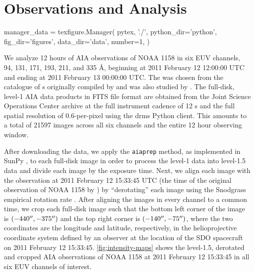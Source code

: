 \section{Observations and Analysis}\label{sec:observations}

\begin{pycode}
manager_data = texfigure.Manager(
    pytex, './',
    python_dir='python',
    fig_dir='figures',
    data_dir='data',
    number=1,
)
\end{pycode}

We analyze 12 hours of AIA observations of \AR{} NOAA 1158 in six EUV channels, 94, 131, 171, 193, 211, and 335 \AA{}, beginning at 2011 February 12 12:00:00 UTC and ending at 2011 February 13 00:00:00 UTC. The \AR{} was chosen from the catalogue of \AR s originally compiled by \citet{warren_systematic_2012} and was also studied by \citet{viall_survey_2017}. The full-disk, level-1 AIA data products in FITS file format are obtained from the Joint Science Operations Center \citep[JSOC,][]{couvidat_observables_2016} archive at the full instrument cadence of 12 s and the full spatial resolution of 0.6\arcsec-per-pixel using the drms Python client. This amounts to a total of 21597 images across all six channels and the entire 12 hour observing window.

After downloading the data, we apply the \texttt{aiaprep} method, as implemented in SunPy \citep{sunpy_community_sunpypython_2015}, to each full-disk image in order to process the level-1 data into level-1.5 data and divide each image by the exposure time. Next, we align each image with the observation at 2011 February 12 15:33:45 UTC (the time of the original observation of NOAA 1158 by \citet{warren_systematic_2012}) by ``derotating'' each image using the Snodgrass empirical rotation rate \citep{snodgrass_magnetic_1983}. After aligning the images in every channel to a common time, we crop each full-disk image such that the bottom left corner of the image is $(-440\mbox{$^{\prime\prime}$},-375\mbox{$^{\prime\prime}$})$ and the top right corner is $(-140\mbox{$^{\prime\prime}$},-75\mbox{$^{\prime\prime}$})$, where the two coordinates are the longitude and latitude, respectively, in the helioprojective coordinate system \citep[see][]{thompson_coordinate_2006} defined by an observer at the location of the SDO spacecraft on 2011 February 12 15:33:45. \autoref{fig:intensity-maps} shows the level-1.5, derotated and cropped AIA observations of \AR{} NOAA 1158 at 2011 February 12 15:33:45 in all six EUV channels of interest.

